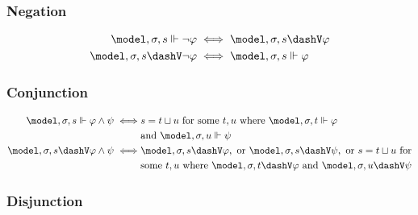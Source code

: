 \documentclass[../LogosReference.tex]{subfiles}
\begin{document}
\subsubsection{Negation}\label{sec:negation}

\begin{definition}\label{def:negation-verification}
	\begin{align}
		\model, \assignment, s \verifies \neg\metaA  & \iff \model, \assignment, s \falsifies \metaA \\
		\model, \assignment, s \falsifies \neg\metaA & \iff \model, \assignment, s \verifies \metaA
	\end{align}
\end{definition}

\subsubsection{Conjunction}\label{sec:conjunction}

\begin{definition}\label{def:conjunction-verification}
	\begin{align}
		\model, \assignment, s \verifies \metaA \land \metaB \iff
		 & s = \fusion{t}{u} \text{ for some } t, u \text{ where } \model, \assignment, t \verifies \metaA \notag                                           \\
		 & \text{and } \model, \assignment, u \verifies \metaB                                                                                              \\
		\model, \assignment, s \falsifies \metaA \land \metaB \iff
		 & \model, \assignment, s \falsifies \metaA, \text{ or } \model, \assignment, s \falsifies \metaB, \text{ or } s = \fusion{t}{u} \text{ for} \notag \\
		 & \text{some } t, u \text{ where } \model, \assignment, t \falsifies \metaA \text{ and } \model, \assignment, u \falsifies \metaB
	\end{align}
\end{definition}

\subsubsection{Disjunction}\label{sec:disjunction}
\end{document}
